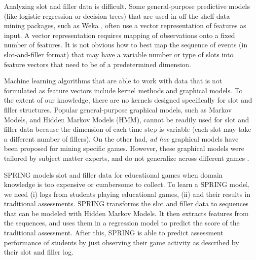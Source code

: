 \documentclass{sigchi}
\def\algname{SPRING\xspace}
\begin{document}
	
	Analyzing slot and filler data is difficult.
	Some general-purpose predictive models (like logistic regression or decision trees)  that are used in off-the-shelf data mining packages, such as Weka \cite{hall2009weka}, often use a vector representation of features as input. 
	A vector representation requires mapping of observations onto a fixed number of features.
	It is not obvious how to best map the sequence of events (in slot-and-filler format) that may have a variable number or type of slots into feature vectors  that need to be of a predetermined dimension.
	
	Machine learning algorithms that are able to work with data that is not formulated as feature vectors include kernel methods and graphical models.
	To the extent of our knowledge, there are no kernels designed specifically for slot and filler structures.
	Popular general-purpose graphical models, such as Markov Models, and Hidden Markov Models (HMM), cannot be readily used for slot and filler data because the dimension of each time step is variable (each slot may take a different number of fillers).
	On the other had,  \textit{ad hoc} graphical models have  been proposed for mining specific games.
	However, these graphical models were tailored by subject matter experts, and do not generalize across different games \cite{rowe2010integrating}.
	
	\algname models slot and filler data for educational games when domain knowledge is too expensive or cumbersome to collect.
	To learn a \algname model, we need (i) logs  from students playing educational games, (ii) and  their results in  traditional assessments.
	\algname transforms the slot and filler data to sequences that can be modeled with Hidden Markov Models.
	It then extracts features from the sequences, and uses them in a regression model to predict the score of the traditional assessment.
	After this, \algname is able to predict assessment performance of students by just observing their game activity as described by their slot and filler log.
	
\end{document}
